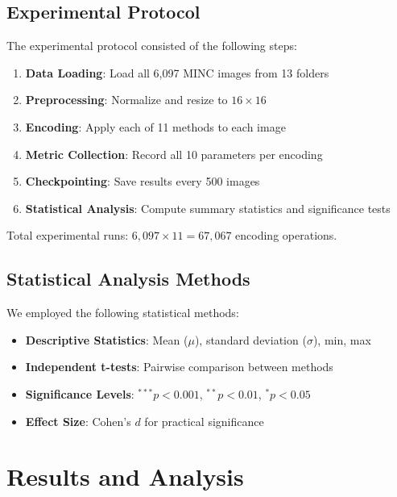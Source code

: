 \documentclass{ipol}
\begin{document}
\subsection{Experimental Protocol}

The experimental protocol consisted of the following steps:

\begin{enumerate}
\item \textbf{Data Loading}: Load all 6,097 MINC images from 13 folders
\item \textbf{Preprocessing}: Normalize and resize to $16 \times 16$
\item \textbf{Encoding}: Apply each of 11 methods to each image
\item \textbf{Metric Collection}: Record all 10 parameters per encoding
\item \textbf{Checkpointing}: Save results every 500 images
\item \textbf{Statistical Analysis}: Compute summary statistics and significance tests
\end{enumerate}

Total experimental runs: $6,097 \times 11 = 67,067$ encoding operations.

\subsection{Statistical Analysis Methods}

We employed the following statistical methods:

\begin{itemize}
\item \textbf{Descriptive Statistics}: Mean ($\mu$), standard deviation ($\sigma$), min, max
\item \textbf{Independent t-tests}: Pairwise comparison between methods
\item \textbf{Significance Levels}: $^{***}p < 0.001$, $^{**}p < 0.01$, $^{*}p < 0.05$
\item \textbf{Effect Size}: Cohen's $d$ for practical significance
\end{itemize}


\section{Results and Analysis}\label{sec:results}
\end{document}
